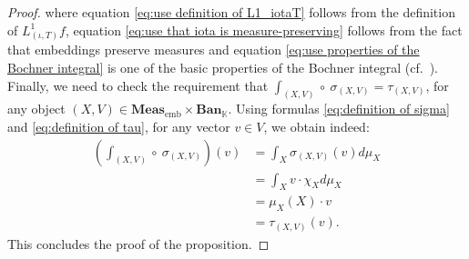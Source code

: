 \documentclass{amsart}
\theoremstyle{definition}
\theoremstyle{plain}
\newcommand{\embMeas}{\mathbf{Meas}_\mathrm{emb}}
\newcommand{\Ban}{\mathbf{Ban}_{\mathbb{K}}}
\begin{document}
\begin{proof}
            where equation \eqref{eq:use definition of L1_iotaT} follows from the definition of $L^1_{(\iota,T)} f$, equation \eqref{eq:use that iota is measure-preserving} follows from the fact that embeddings preserve measures and equation \eqref{eq:use properties of the Bochner integral} is one of the basic properties of the Bochner integral (cf.~\cite[\S V.5, Corollary 2]{Yosida1995}). \\
            Finally, we need to check the requirement that $\int_{(X,V)} \circ ~ \sigma_{(X,V)} = \tau_{(X,V)}$, for any object $(X,V) \in \embMeas \times \Ban$.
            Using formulas \eqref{eq:definition of sigma} and \eqref{eq:definition of tau}, for any vector $v \in V$, we obtain indeed: 
            \begin{align*}
                \left( \int_{(X,V)} \circ ~ \sigma_{(X,V)} \right) (v) &= \int_X \sigma_{(X,V)}(v) d\mu_X \\
                &= \int_X v \cdot \chi_X d\mu_X \\
                &= \mu_X(X) \cdot v \\
                &= \tau_{(X,V)} (v).
            \end{align*}
            This concludes the proof of the proposition.
        \end{proof}
\end{document}
